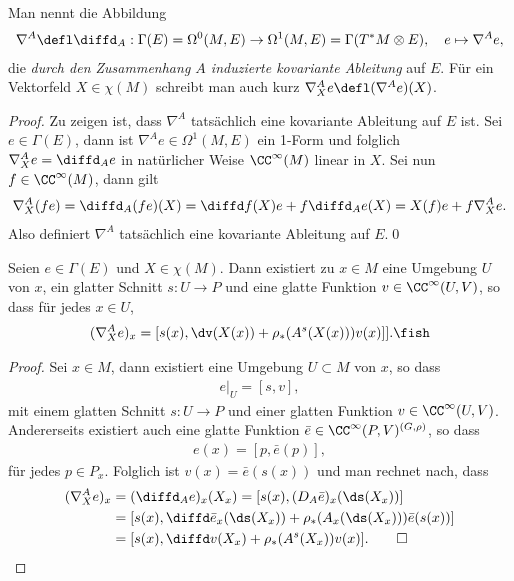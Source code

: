 \documentclass[%
	paper=a5,%
	fleqn,%
	DIV=18,%
	BCOR=0mm,
	fontsize=11pt,
	titlepage=false,%
	bibliography=totoc,
	DIV=18,%
	twoside=true,
	pdftitle=Riemannsche Geometrie,
	pdfauthor=Uwe Semmelmann,
	numbers=noendperiod]%
	{scrbook}
\begin{document}
\begin{defn}
Man nennt die Abbildung
\begin{align*}
\nabla^A \defl \diffd_A : \Gamma(E)=\Omega^0(M,E)\to
\Omega^1(M,E) = \Gamma(T^*M \otimes E),\quad e\mapsto \nabla^A e,
\end{align*}
die \emph{durch den Zusammenhang $A$ induzierte kovariante Ableitung} auf $E$.
Für ein Vektorfeld $X\in \chi(M)$ schreibt man auch kurz $\nabla^A_Xe \defl
(\nabla^A e)(X)$.\fish
\end{defn}
\begin{proof}
Zu zeigen ist, dass $\nabla^A$ tatsächlich eine kovariante Ableitung auf $E$
ist. Sei $e\in\Gamma(E)$, dann ist $\nabla^A e\in\Omega^1(M,E)$ ein 1-Form und
folglich $\nabla^A_X e = \diffd_A e$ in natürlicher Weise $\CC^\infty(M)$ linear
in $X$. Sei nun $f\in\CC^\infty(M)$, dann gilt
\begin{align*}
\nabla_X^A (fe) = \diffd_A (fe)(X)
= \diffd f(X)e + f\diffd_A e(X)
= X(f)e + f\nabla_X^A e.
\end{align*}
Also definiert $\nabla^A$ tatsächlich eine kovariante Ableitung auf $E$.\qed
\end{proof}

\begin{prop}
Seien $e\in\Gamma(E)$ und $X\in\chi(M)$. Dann existiert zu $x\in M$ eine
Umgebung $U$ von $x$, ein glatter Schnitt $s: U\to P$ und eine glatte
Funktion $v\in \CC^\infty(U,V)$, so dass für jedes $x\in U$,
\begin{align*}
(\nabla_X^A e)_x = [s(x),\dv(X(x))+\rho_*(A^s(X(x)))v(x)]].\fish
\end{align*}
\end{prop}
\begin{proof}
Sei $x\in M$, dann existiert eine Umgebung $U\subset M$ von $x$, so dass
\begin{align*}
e\big|_U = [s,v],
\end{align*}
mit einem glatten Schnitt $s: U\to P$ und einer glatten Funktion
$v\in\CC^\infty(U,V)$. Andererseits existiert auch eine glatte Funktion
$\bar{e}\in \CC^\infty(P,V)^{(G,\rho)}$, so dass
\begin{align*}
e(x) = [p,\bar{e}(p)],
\end{align*}
für jedes $p\in P_x$. Folglich ist $v(x) = \bar{e}(s(x))$ und man rechnet nach,
dass
\begin{align*}
(\nabla_X^A e)_x &= (\diffd_A e)_x(X_x)
= [s(x),(D_A \bar{e})_x(\ds(X_x))]\\
&= [s(x),\diffd \bar{e}_x(\ds(X_x)) + \rho_*(A_x(\ds(X_x)))\bar{e}(s(x))]\\
&= [s(x),\diffd v(X_x) + \rho_*(A^s(X_x))v(x)].\qed
\end{align*}
\end{proof}
\end{document}
